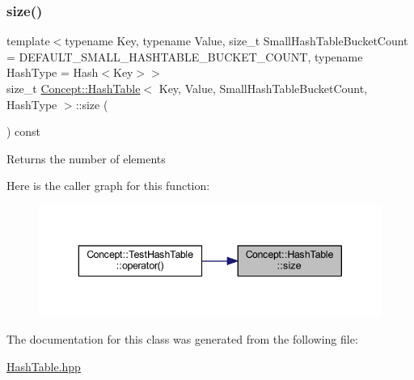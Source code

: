 \subsubsection{\texorpdfstring{size()}{size()}}
{\footnotesize\ttfamily template$<$typename Key, typename Value, size\+\_\+t Small\+Hash\+Table\+Bucket\+Count = D\+E\+F\+A\+U\+L\+T\+\_\+\+S\+M\+A\+L\+L\+\_\+\+H\+A\+S\+H\+T\+A\+B\+L\+E\+\_\+\+B\+U\+C\+K\+E\+T\+\_\+\+C\+O\+U\+NT, typename Hash\+Type = Hash$<$\+Key$>$$>$ \\
size\+\_\+t \mbox{\hyperlink{class_concept_1_1_hash_table}{Concept\+::\+Hash\+Table}}$<$ Key, Value, Small\+Hash\+Table\+Bucket\+Count, Hash\+Type $>$\+::size (\begin{DoxyParamCaption}{ }\end{DoxyParamCaption}) const\hspace{0.3cm}{\ttfamily [inline]}}

\begin{DoxyReturn}{Returns}
the number of elements 
\end{DoxyReturn}
Here is the caller graph for this function\+:\nopagebreak
\begin{figure}[H]
\begin{center}
\leavevmode
\includegraphics[width=343pt]{class_concept_1_1_hash_table_ae68cb33ed169ec0072be4fbeab1e4ff7_icgraph}
\end{center}
\end{figure}


The documentation for this class was generated from the following file\+:\begin{DoxyCompactItemize}
\item 
\mbox{\hyperlink{_hash_table_8hpp}{Hash\+Table.\+hpp}}\end{DoxyCompactItemize}
